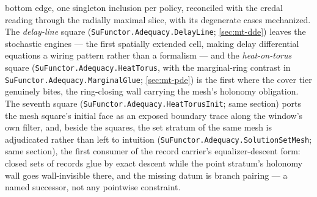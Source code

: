 bottom edge, one singleton inclusion per policy, reconciled with
the credal reading through the radially maximal slice, with its
degenerate cases mechanized. The \emph{delay-line}
square (\texttt{SuFunctor.Adequacy.DelayLine};
\autoref{sec:mt-dde}) leaves the stochastic engines --- the
first spatially extended cell, making delay differential equations
a wiring pattern rather than a formalism --- and the
\emph{heat-on-torus} square (\texttt{SuFunctor.Adequacy.HeatTorus},
with the marginal-ring contrast in
\texttt{SuFunctor.Adequacy.MarginalGlue}; \autoref{sec:mt-pde})
is the first where the cover tier genuinely bites, the ring-closing
wall carrying the mesh's holonomy obligation. The seventh square
(\texttt{SuFunctor.Adequacy.HeatTorusInit}; same section) ports the
mesh square's initial face as an exposed boundary trace along the
window's own filter, and, beside the squares, the set stratum of
the same mesh is adjudicated rather than left to intuition
(\texttt{SuFunctor.Adequacy.SolutionSetMesh}; same section), the
first consumer of the record carrier's equalizer-descent form:
closed sets of records glue by exact descent while the point stratum's
holonomy wall goes wall-invisible there, and the missing datum is
branch pairing --- a named successor, not any pointwise constraint.

